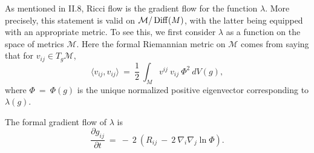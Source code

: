 As mentioned in II.8, Ricci flow is the gradient flow
for the function $\lambda$. More precisely, this statement  is valid on ${\mathcal M}/\operatorname{Diff}(M)$,
with the latter being equipped with an appropriate metric.
To see this, we first
consider $\lambda$ as a function on the space of metrics ${\mathcal M}$.
Here the formal Riemannian metric on ${\mathcal M}$ comes from saying
that for $v_{ij} \in T_g {\mathcal M}$,
\begin{equation} \label{riemmetric}
\langle v_{ij}, v_{ij} \rangle \: = \: \frac12 \:
\int_M v^{ij} \: v_{ij} \: \Phi^2 \: dV(g),
\end{equation}
where $\Phi \: = \: \Phi(g)$ is the unique
normalized positive eigenvector corresponding to $\lambda(g)$.

\begin{lemma}
  \label{lem:kl-ricci-flow-as-gradient-flow-gradient-flow-formula-lambda-invariant}

The formal gradient flow of $\lambda$
is
\begin{equation}
\frac{\partial g_{ij}}{\partial t} \: = \:
- \: 2 \: \left( R_{ij} \: - \: 2 \: \nabla_i \nabla_j \ln \Phi
\right).
\end{equation}
\end{lemma}
